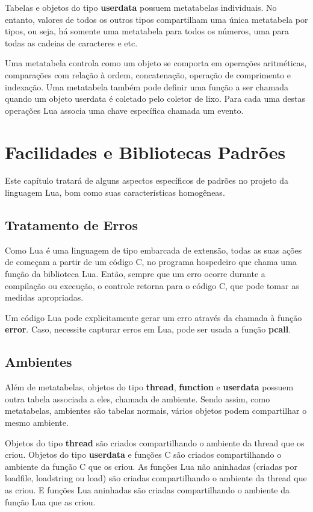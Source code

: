 \documentclass[
12pt, %
openright, %
oneside, %
a4paper, %
english, %
brazil, %
]{abntex2}
\begin{document}
Tabelas e objetos do tipo \textbf{userdata} possuem metatabelas individuais. No entanto, valores de todos os outros tipos compartilham uma única metatabela por tipos, ou seja, há somente uma metatabela para todos os números, uma para todas as cadeias de caracteres e etc.

Uma metatabela controla como um objeto se comporta em operações aritméticas, comparações com relação à ordem, concatenação, operação de comprimento e indexação. Uma metatabela também pode definir uma função a ser chamada quando um objeto userdata é coletado pelo coletor de lixo. Para cada uma destas operações Lua associa uma chave específica chamada um evento.

\chapter{Facilidades e Bibliotecas Padrões}
Este capítulo tratará de alguns aspectos específicos de padrões no projeto da linguagem Lua, bom como suas características homogêneas.

\section{Tratamento de Erros}
Como Lua é uma linguagem de tipo embarcada de extensão, todas as suas ações de começam a partir de um código C, no programa hospedeiro que chama uma função da biblioteca Lua. Então, sempre que um erro ocorre durante a compilação ou execução, o controle retorna para o código C, que pode tomar as medidas apropriadas.

Um código Lua pode explicitamente gerar um erro através da chamada à função \textbf{error}. Caso, necessite capturar erros em Lua, pode ser usada a função \textbf{pcall}.

\section{Ambientes}
Além de metatabelas, objetos do tipo \textbf{thread}, \textbf{function} e \textbf{userdata} possuem outra tabela associada a eles, chamada de ambiente. Sendo assim, como metatabelas, ambientes são tabelas normais, vários objetos podem compartilhar o mesmo ambiente.

Objetos do tipo \textbf{thread} são criados compartilhando o ambiente da thread que os criou. Objetos do tipo \textbf{userdata} e funções C são criados compartilhando o ambiente da função C que os criou. As funções Lua não aninhadas (criadas por loadfile, loadstring ou load) são criadas compartilhando o ambiente da thread que as criou. E funções Lua aninhadas são criadas compartilhando o ambiente da função Lua que as criou.
\end{document}
